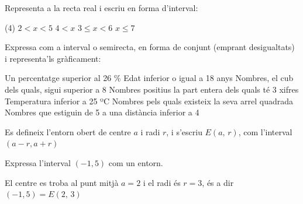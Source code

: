 \begin{mylist}
	\exer  Representa a la recta real i escriu en forma d'interval:
	\begin{tasks}(4)
		\task  $2 < x < 5$
		\task  $4 < x$
		\task $3 \leq x < 6$
		\task 	$x \leq 7$
	\end{tasks}
\answers{[$(2,5)$, $(4,+\infty)$, $[3,6)$, $(-\infty,7]$]}

 

	\exer \spen Expressa com a interval o semirecta, en forma de conjunt (emprant desigualtats) i representa'ls gràficament:
	
	   \begin{tasks}
	   	\task  Un percentatge superior al 26 \% \dotfill
		\task  Edat inferior o igual a 18 anys \dotfill
		\task  Nombres, el cub dels quals, sigui superior a 8 \dotfill
		\task  Nombres positius la part entera dels quals té 3 xifres \dotfill
		\task  Temperatura inferior a 25 ºC \dotfill
		\task  Nombres pels quals existeix la seva arrel quadrada  \dotfill
		\task  Nombres que estiguin de 5 a una distància inferior a 4 \dotfill
	\end{tasks}
\answers{[$(26,100]$, $[0,18]$, $(2,+\infty)$, $[100,1000)$, $(-\infty,25)$, $[0,+\infty)$, $(1,9)$]}

\end{mylist}
\begin{theorybox}
	Es defineix l'entorn obert de centre $a$ i radi $r$, i s'escriu $E(a,\, r)$, com l'interval $(a-r, a+r)$ 
\end{theorybox}

\begin{resolt}{
	Expressa l'interval $(-1,5)$ com un entorn. }
	
	El centre es troba al punt mitjà $a=2$ i el radi és $r=3$, és a dir $(-1,5)=E(2,\, 3)$
\end{resolt}


